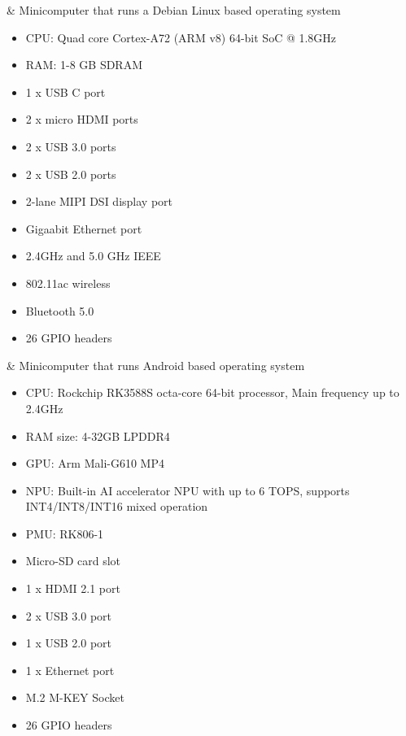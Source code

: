 \documentclass[conference]{IEEEtran}
\begin{document}
\begin{table}[htbp]
\begin{tabular}
             & Minicomputer that runs a Debian Linux based operating system \begin{itemize}
                                \item CPU: Quad core Cortex-A72 (ARM v8) 64-bit SoC @ 1.8GHz
                                \item RAM: 1-8 GB SDRAM
                                \item 1 x USB C port
                                \item 2 x micro HDMI ports
                                \item 2 x USB 3.0 ports
                                \item 2 x USB 2.0 ports
                                \item 2-lane MIPI DSI display port
                                \item Gigaabit Ethernet port
                                \item 2.4GHz and 5.0 GHz IEEE 
                                \item 802.11ac wireless
                                \item Bluetooth 5.0
                                \item 26 GPIO headers
                            \end{itemize}
                        & Minicomputer that runs Android based operating system
                        \begin{itemize}
                            \item CPU: Rockchip RK3588S octa-core 64-bit processor, Main frequency up to 2.4GHz
                            \item RAM size: 4-32GB LPDDR4
                            \item GPU: Arm Mali-G610 MP4
                            \item NPU: Built-in AI accelerator NPU with up to 6 TOPS, supports INT4/INT8/INT16 mixed operation
                            \item PMU: RK806-1
                            \item Micro-SD card slot
                            \item 1 x HDMI 2.1 port
                            \item 2 x USB 3.0 port
                            \item 1 x USB 2.0 port
                            \item 1 x Ethernet port
                            \item M.2 M-KEY Socket
                            \item 26 GPIO headers
                        \end{itemize}
                        

\end{tabular}
\end{table}
\end{document}
